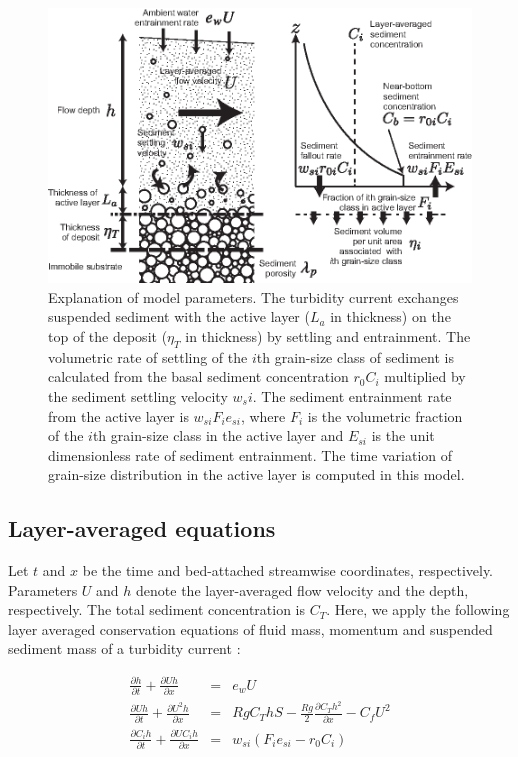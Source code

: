 \begin{figure}[t]
  \includegraphics[width=12cm]{fig02.eps}
  \caption{Explanation of model parameters. The turbidity current exchanges suspended sediment with the active layer ($L_{a}$ in thickness) on the top of the deposit ($\eta_T$ in thickness) by settling and entrainment. The volumetric rate of settling of the $i$th grain-size class of sediment is calculated from the basal sediment concentration $r_{0} C_i$ multiplied by the sediment settling velocity $w_{s}{i}$. The sediment entrainment rate from the active layer is $w_{si} F_i e_{si}$, where $F_i$ is the volumetric fraction of the $i$th grain-size class in the active layer and $E_{si}$ is the unit dimensionless rate of sediment entrainment. The time variation of grain-size distribution in the active layer is computed in this model.}
  \label{fig:model_explanation}
\end{figure}


\subsection{Layer-averaged equations}

Let $t$ and $x$ be the time and bed-attached streamwise coordinates, respectively. Parameters $U$ and $h$ denote the layer-averaged flow velocity and the depth, respectively. The total sediment concentration is $C_T$. Here, we apply the following layer averaged conservation equations of fluid mass, momentum and suspended sediment mass of a turbidity current \citep{parker1986self,kostic2006response}:

\begin{eqnarray}
  \frac{\partial h}{\partial t} + \frac{\partial Uh}{\partial x} & = & e_wU \label{eq:conserv_fluidmass} \\
  \frac{\partial Uh}{\partial t} + \frac{\partial U^2h}{\partial x} & = & R g C_T h S - \frac{Rg}{2}\frac{\partial C_T h^2}{\partial x} - C_f U^{2} \label{eq:conserv_momentum} \\
\frac{\partial C_i h}{\partial t} + \frac{\partial U C_i h}{\partial x} & = & w_{si} (F_i e_{si} - r_0 C_i) \label{eq:conserv_suspensionmass}
\end{eqnarray}

